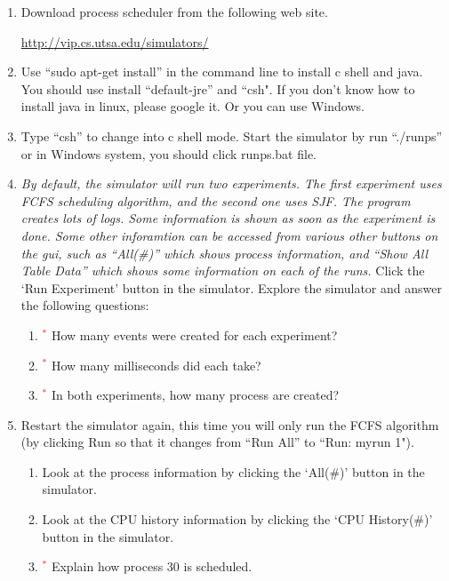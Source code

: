 \documentclass[16pt]{article}
\begin{document}
\begin{enumerate}
\item Download process scheduler from the following web site.

\url{http://vip.cs.utsa.edu/simulators/}

\item Use ``sudo apt-get install'' in the command line to install c shell and java. You should use install ``default-jre'' and ``csh". If you don't know how to install java in linux, please google it. Or you can use Windows.

\item Type ``csh'' to change into c shell mode. Start the simulator by run ``./runps'' or in Windows system, you should click runps.bat file.

\item  {\it By default, the simulator will run two experiments. The first experiment uses FCFS
scheduling algorithm, and the second one uses SJF. The program creates lots of logs. Some information
is shown as soon as the experiment is done. Some other inforamtion can be accessed from various other buttons on the gui, such as ``All(\#)'' which shows process information, and ``Show All Table Data'' which shows some information on each of the runs.} Click the `Run Experiment' button in the
simulator. Explore the simulator and answer the following questions:

\begin{enumerate}
\item \textcolor{red}{$^{*}$} How many events were created for each experiment?
\item \textcolor{red}{$^{*}$} How many milliseconds did each take?
\item \textcolor{red}{$^{*}$} In both experiments, how many process are created?

\end{enumerate}

\item Restart the simulator again, this time you will only run the FCFS algorithm (by clicking
Run so that it changes from ``Run All'' to ``Run: myrun 1").

\begin{enumerate}
\item Look at the process information by clicking the `All(\#)' button in the simulator.
\item Look at the CPU history information by clicking the `CPU History(\#)' button in the simulator.
\item \textcolor{red}{$^{*}$} Explain how process 30 is scheduled.
\end{enumerate}


\end{enumerate}
\end{document}
